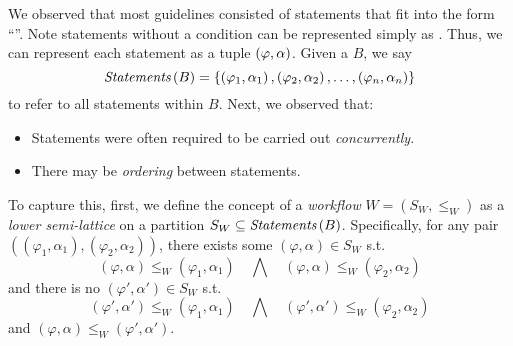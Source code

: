 We observed that most guidelines consisted of statements that fit
into the form ``''. Note
statements without a condition can be represented simply as .
Thus, we can represent each statement as a tuple ${\left(\varphi, \alpha\right)}{}$.
Given a \BPG{} $B$, we say
\[
\textit{Statements}\left(B\right) =
\left\{\left(\varphi_1,\alpha_1\right),\left(\varphi_2,\alpha_2\right),\dots,\left(\varphi_n,\alpha_n\right)\right\}
\]
to refer to all statements within $B$. Next, we observed that:
\begin{itemize}
  \item Statements were often required to be carried out \emph{concurrently}.
  \item There may be \emph{ordering} between statements.
\end{itemize}
To capture this, first, we define the concept of a \emph{workflow}
$W = \left(S_W, \leq_W\right)$ as a \emph{lower semi-lattice} on a partition $S_W \subseteq \textit{Statements}\left(B\right)$.
Specifically, for any pair $\left(\left(\varphi_1,\alpha_1\right),
\left(\varphi_2, \alpha_2\right)\right)$, there exists some
$\left(\varphi,\alpha\right) \in S_W$ s.t.
\[
    \left(\varphi,\alpha\right) \leq_W
    \left(\varphi_1,\alpha_1\right)\quad\bigwedge\quad
    \left(\varphi,\alpha\right) \leq_W \left(\varphi_2,\alpha_2\right)
\]
\noindent and there is no $\left(\varphi',\alpha'\right) \in S_W$ s.t.
\[
    \left(\varphi',\alpha'\right) \leq_W
    \left(\varphi_1,\alpha_1\right)\quad\bigwedge\quad\left(\varphi',\alpha'\right) \leq_W
    \left(\varphi_2,\alpha_2\right)
\]
\noindent and $\left(\varphi,\alpha\right) \leq_W \left(\varphi',\alpha'\right)$.


